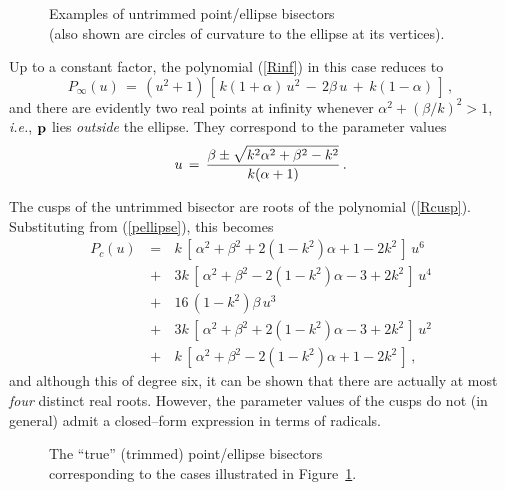 \begin{figure}[htbp] \vspace{6.2in}
\caption[]{Examples of untrimmed point/ellipse bisectors \\ (also
shown are circles of curvature to the ellipse at its vertices).}
\label{fig:euntrim} \end{figure}

Up to a constant factor, the polynomial (\ref{Rinf}) in this case
reduces to
\begin{equation}
P_\infty(u) \,=\, (u^2+1)\,
[\,k(1+\alpha)\,u^2\,-\,2\beta\,u\,+\,k(1-\alpha)\,] \,,
\end{equation}
and there are evidently two real points at infinity whenever $\alpha^2+
(\beta/k)^2>1$, {\it i.e.}, ${\bf p}$ lies {\it outside\/} the ellipse.
They correspond to the parameter values
\begin{equation} \label{uinfellps}
u \,=\, {\beta \pm \displaystyle{\sqrt
{k^2\alpha^2+\beta^2-k^2}} \over k(\alpha+1)} \,.
\end{equation}

The cusps of the untrimmed bisector are roots of the polynomial
(\ref{Rcusp}). Substituting from (\ref{pellipse}), this becomes
\begin{eqnarray}
P_c(u) &\,=\,& k\,[\,\alpha^2+\beta^2+2(1-k^2)\alpha+1-2k^2\,]\,u^6
 \nonumber \\
&\,+\,& 3k\,[\,\alpha^2+\beta^2-2(1-k^2)\alpha-3+2k^2\,]\,u^4
 \nonumber \\
&\,+\,& 16\,(1-k^2)\beta\,u^3
 \nonumber \\
&\,+\,& 3k\,[\,\alpha^2+\beta^2+2(1-k^2)\alpha-3+2k^2\,]\,u^2
 \nonumber \\
&\,+\,& k\,[\,\alpha^2+\beta^2-2(1-k^2)\alpha+1-2k^2\,] \,,
\end{eqnarray}
and although this of degree six, it can be shown that there
are actually at most {\it four\/} distinct real roots. However,
the parameter values of the cusps do not (in general) admit a
closed--form expression in terms of radicals.

\begin{figure}[htbp] \vspace{6.2in}
\caption[]{The ``true'' (trimmed) point/ellipse bisectors \\
corresponding to the cases illustrated in Figure~\ref{fig:euntrim}.}
\label{fig:etrim} \end{figure}

